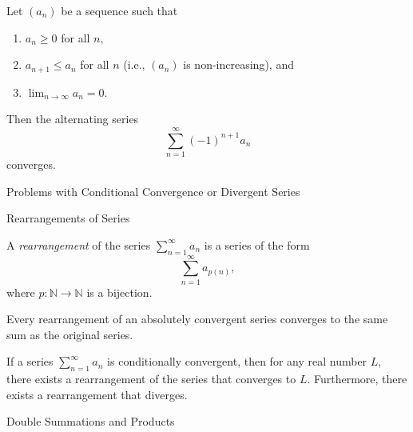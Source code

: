 \documentclass[12pt, a4paper]{article}
\begin{document}
\clearpage

\begin{theorem}
	Let $(a_n)$ be a sequence such that
	\begin{enumerate}
		\item $a_n \geq 0$ for all $n$,
		\item $a_{n+1} \leq a_n$ for all $n$ (i.e., $(a_n)$ is non-increasing), and
		\item $\lim_{n \to \infty} a_n = 0$.
	\end{enumerate}
	Then the alternating series
	\[
	\sum_{n=1}^{\infty} (-1)^{n+1} a_n
	\]
	converges.
\end{theorem}

\clearpage

\begin{heading}
	Problems with Conditional Convergence or Divergent Series
\end{heading}

\clearpage

\begin{heading}
	Rearrangements of Series
\end{heading}

\vspace{10pt}

\begin{definition}
	A \textit{rearrangement} of the series $\sum_{n=1}^{\infty} a_n$ is a series of the form
	\[
	\sum_{n=1}^{\infty} a_{p(n)},
	\]
	where $p: \mathbb{N} \to \mathbb{N}$ is a bijection.
\end{definition}


\clearpage

\begin{theorem}
	Every rearrangement of an absolutely convergent series converges to the same sum as the original series.
\end{theorem}

\clearpage

\begin{theorem}
	If a series $\sum_{n=1}^{\infty} a_n$ is conditionally convergent, then for any real number $L$, there exists a rearrangement of the series that converges to $L$. Furthermore, there exists a rearrangement that diverges.	
\end{theorem}

\clearpage

\begin{heading}
	Double Summations and Products
\end{heading}
\end{document}
